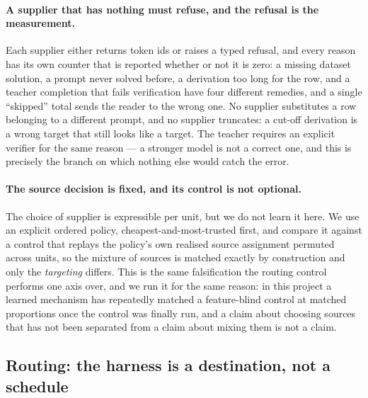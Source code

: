 \paragraph{A supplier that has nothing must refuse, and the refusal is the measurement.} Each
supplier either returns token ids or raises a typed refusal, and every reason has its own
counter that is reported whether or not it is zero: a missing dataset solution, a prompt never
solved before, a derivation too long for the row, and a teacher completion that fails
verification have four different remedies, and a single ``skipped'' total sends the reader to
the wrong one. No supplier substitutes a row belonging to a different prompt, and no supplier
truncates: a cut-off derivation is a wrong target that still looks like a target. The teacher
requires an explicit verifier for the same reason --- a stronger model is not a correct one, and
this is precisely the branch on which nothing else would catch the error.

\paragraph{The source decision is fixed, and its control is not optional.} The choice of
supplier is expressible per unit, but we do not learn it here. We use an explicit ordered
policy, cheapest-and-most-trusted first, and compare it against a control that replays the
policy's own realised source assignment permuted across units, so the mixture of sources is
matched exactly by construction and only the \emph{targeting} differs. This is the same
falsification the routing control performs one axis over, and we run it for the same reason: in
this project a learned mechanism has repeatedly matched a feature-blind control at matched
proportions once the control was finally run, and a claim about choosing sources that has not
been separated from a claim about mixing them is not a claim.

\subsection{Routing: the harness is a destination, not a schedule}
\label{sec:routing}


